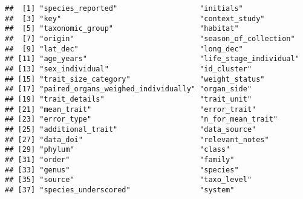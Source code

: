 \documentclass[
]{article}
\begin{document}
\begin{verbatim}
##  [1] "species_reported"                   "initials"                          
##  [3] "key"                                "context_study"                     
##  [5] "taxonomic_group"                    "habitat"                           
##  [7] "origin"                             "season_of_collection"              
##  [9] "lat_dec"                            "long_dec"                          
## [11] "age_years"                          "life_stage_individual"             
## [13] "sex_individual"                     "id_cluster"                        
## [15] "trait_size_category"                "weight_status"                     
## [17] "paired_organs_weighed_individually" "organ_side"                        
## [19] "trait_details"                      "trait_unit"                        
## [21] "mean_trait"                         "error_trait"                       
## [23] "error_type"                         "n_for_mean_trait"                  
## [25] "additional_trait"                   "data_source"                       
## [27] "data_doi"                           "relevant_notes"                    
## [29] "phylum"                             "class"                             
## [31] "order"                              "family"                            
## [33] "genus"                              "species"                           
## [35] "source"                             "taxo_level"                        
## [37] "species_underscored"                "system"
\end{verbatim}
\end{document}

